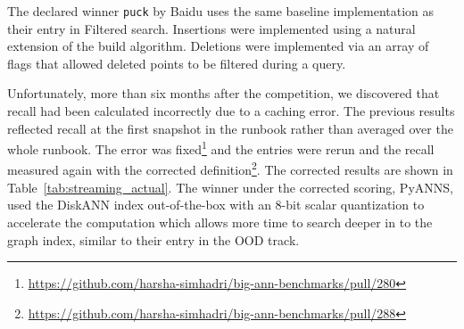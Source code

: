 The declared winner \texttt{puck} by Baidu uses the same baseline implementation as their entry in Filtered search. %
%
%
%
%
Insertions were implemented using a natural extension of the build algorithm.
%
Deletions were implemented via an array of flags that allowed deleted points to be filtered during a query.

Unfortunately, more than six months after the competition, 
we discovered that recall had been calculated incorrectly due to a caching error.
The previous results reflected recall at the first snapshot in the runbook rather than averaged over the whole runbook.
The error was fixed\footnote{\url{https://github.com/harsha-simhadri/big-ann-benchmarks/pull/280}}
and the entries were rerun and the recall measured again with the corrected definition\footnote{\url{https://github.com/harsha-simhadri/big-ann-benchmarks/pull/288}}.
The corrected results are shown in Table~\ref{tab:streaming_actual}.
The winner under the corrected scoring, PyANNS, used the DiskANN index out-of-the-box with an 8-bit scalar quantization to accelerate the computation which allows more time to search deeper in to the graph index, similar to their entry in the OOD track.


